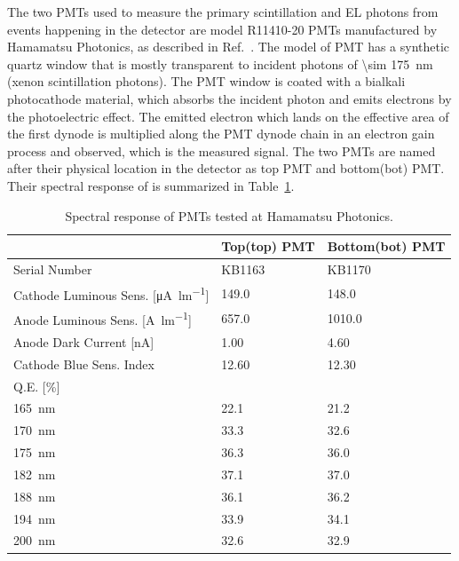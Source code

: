 The two PMTs used to measure the primary scintillation and EL photons from events happening in the detector are model R11410-20 PMTs manufactured by Hamamatsu Photonics, as described in Ref.~\cite{HamamatsuPhotonics2006}. The model of PMT has a synthetic quartz window that is mostly transparent to incident photons of \SI{\sim 175}{\nm} (xenon scintillation photons). The PMT window is coated with a bialkali photocathode material, which absorbs the incident photon and emits electrons by the photoelectric effect. The emitted electron which lands on the effective area of the first dynode is multiplied along the PMT dynode chain in an electron gain process and observed, which is the measured signal.
The two PMTs are named after their physical location in the detector as top PMT and bottom(bot) PMT. Their spectral response of is summarized in Table~\ref{tab:PMTparameterHamamatsu}.
\begin{table}[!h]
	\centering
	\begin{tabular}[!tb]{ | m{16em} ||m{9em} | m{9em}| } 
		\hline
		&Top(top) PMT&Bottom(bot) PMT\\\hline\hline
		Serial Number & KB1163 & KB1170 \\\hline
		Cathode Luminous Sens. [\si{\uA\per\lumen}] & 149.0 & 148.0 \\\hline
		Anode Luminous Sens. [\si{\A\per\lumen}] & 657.0 & 1010.0 \\\hline
		Anode Dark Current [\si{\nA}] & 1.00 & 4.60 \\\hline
		Cathode Blue Sens. Index  & 12.60 & 12.30 \\\hline
		Q.E. [\si{\percent}] & &  \\\hline
		\quad \quad \SI{165}{\nm} & 22.1 & 21.2 \\\hline
		\quad \quad \SI{170}{\nm} & 33.3 & 32.6 \\\hline
		\quad \quad \SI{175}{\nm} & 36.3 & 36.0 \\\hline
		\quad \quad \SI{182}{\nm} & 37.1 & 37.0 \\\hline
		\quad \quad \SI{188}{\nm} & 36.1 & 36.2 \\\hline
		\quad \quad \SI{194}{\nm} & 33.9 & 34.1 \\\hline
		\quad \quad \SI{200}{\nm}& 32.6 & 32.9 \\\hline	
	\end{tabular}
	\caption[Spectral response of PMTs tested at Hamamatsu Photonics]{Spectral response of PMTs tested at Hamamatsu Photonics.}
	\label{tab:PMTparameterHamamatsu}  
\end{table}

